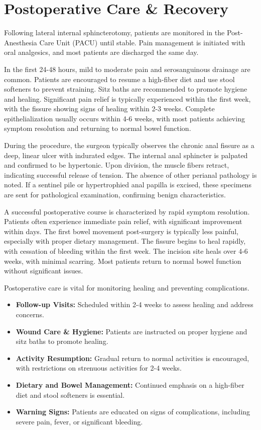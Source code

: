 \section*{Postoperative Care \& Recovery}
Following lateral internal sphincterotomy, patients are monitored in the Post-Anesthesia Care Unit (PACU) until stable. Pain management is initiated with oral analgesics, and most patients are discharged the same day. 

In the first 24-48 hours, mild to moderate pain and serosanguinous drainage are common. Patients are encouraged to resume a high-fiber diet and use stool softeners to prevent straining. Sitz baths are recommended to promote hygiene and healing. Significant pain relief is typically experienced within the first week, with the fissure showing signs of healing within 2-3 weeks. Complete epithelialization usually occurs within 4-6 weeks, with most patients achieving symptom resolution and returning to normal bowel function.

During the procedure, the surgeon typically observes the chronic anal fissure as a deep, linear ulcer with indurated edges. The internal anal sphincter is palpated and confirmed to be hypertonic. Upon division, the muscle fibers retract, indicating successful release of tension. The absence of other perianal pathology is noted. If a sentinel pile or hypertrophied anal papilla is excised, these specimens are sent for pathological examination, confirming benign characteristics.

A successful postoperative course is characterized by rapid symptom resolution. Patients often experience immediate pain relief, with significant improvement within days. The first bowel movement post-surgery is typically less painful, especially with proper dietary management. The fissure begins to heal rapidly, with cessation of bleeding within the first week. The incision site heals over 4-6 weeks, with minimal scarring. Most patients return to normal bowel function without significant issues.

Postoperative care is vital for monitoring healing and preventing complications.

\begin{itemize}
  \item \textbf{Follow-up Visits:} Scheduled within 2-4 weeks to assess healing and address concerns.
  \item \textbf{Wound Care \& Hygiene:} Patients are instructed on proper hygiene and sitz baths to promote healing.
  \item \textbf{Activity Resumption:} Gradual return to normal activities is encouraged, with restrictions on strenuous activities for 2-4 weeks.
  \item \textbf{Dietary and Bowel Management:} Continued emphasis on a high-fiber diet and stool softeners is essential.
  \item \textbf{Warning Signs:} Patients are educated on signs of complications, including severe pain, fever, or significant bleeding.
\end{itemize}

